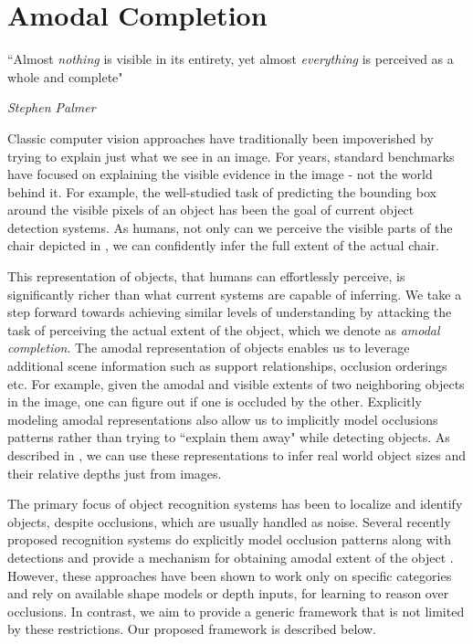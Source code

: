 \section{Amodal Completion}
\setlength{\epigraphwidth}{.9\textwidth}
\epigraph{``Almost \textit{nothing} is visible in its entirety, yet almost \textit{everything} is perceived as a whole and complete"}{\textit{Stephen Palmer}}

Classic computer vision approaches have traditionally been impoverished by trying to explain just what we see in an image. For years, standard benchmarks have focused on explaining the visible evidence in the image - not the world behind it. For example, the well-studied task of predicting the bounding box around the visible pixels of an object has been the goal of current object detection systems. As humans, not only can we perceive the visible parts of the chair depicted in , we can confidently infer the full extent of the actual chair.

This representation of objects, that humans can effortlessly perceive, is significantly richer than what current systems are capable of inferring. We take a step forward towards achieving similar levels of understanding by attacking the task of perceiving the actual extent of the object, which we denote as \textit{amodal completion}. The amodal representation of objects enables us to leverage additional scene information such as support relationships, occlusion orderings etc. For example, given the amodal and visible extents of two neighboring objects in the image, one can figure out if one is occluded by the other. Explicitly modeling amodal representations also allow us to implicitly model occlusions patterns rather than trying to ``explain them away" while detecting objects. As described in , we can use these representations to infer real world object sizes and their relative depths just from images.

The primary focus of object recognition systems \cite{girshick2013rich,felzens_latent_pami10} has been to localize and identify objects, despite occlusions, which are usually handled as noise. Several recently proposed recognition systems do explicitly model occlusion patterns along with detections and provide a mechanism for obtaining amodal extent of the object \cite{ghiasi2014parsing, xiang_cvpr15, zia2014towards}. However, these approaches have been shown to work only on specific categories and rely on available shape models or depth inputs, for learning to reason over occlusions. In contrast, we aim to provide a generic framework that is not limited by these restrictions. Our proposed framework is described below.

